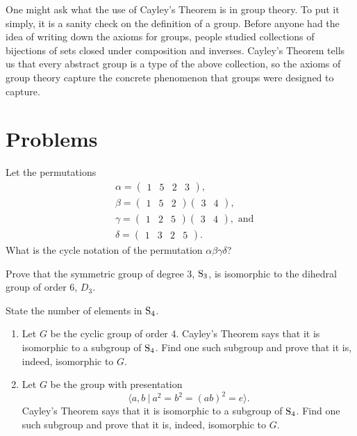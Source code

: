One might ask what the use of Cayley's Theorem is in group theory. To put it simply, it is a sanity check on the definition of a group. Before anyone had the idea of writing down the axioms for groups, people studied collections of bijections of sets closed under composition and inverses. Cayley's Theorem tells us that every abstract group is a type of the above collection, so the axioms of group theory capture the concrete phenomenon that groups were designed to capture.

\newpage

\section{Problems}
\begin{problem}
    Let the permutations
    \begin{align*}
        &\alpha = \begin{pmatrix}1 & 5 & 2 & 3\end{pmatrix},\\
        &\beta = \begin{pmatrix}1 & 5 & 2\end{pmatrix}\begin{pmatrix}3 & 4\end{pmatrix},\\
        &\gamma = \begin{pmatrix}1 & 2 & 5\end{pmatrix}\begin{pmatrix}3 & 4\end{pmatrix}, \text{ and}\\
        &\delta = \begin{pmatrix}1 & 3 & 2 & 5\end{pmatrix}.
    \end{align*}
    What is the cycle notation of the permutation $\alpha\beta\gamma\delta$?
\end{problem}

\begin{problem}
    Prove that the symmetric group of degree 3, $\mathrm{S}_{3}$, is isomorphic to the dihedral group of order 6, $D_3$.
\end{problem}

\begin{problem}
    State the number of elements in $\mathrm{S}_{4}$.
    \begin{enumerate}[label=(\alph*)]
        \item Let $G$ be the cyclic group of order 4. Cayley’s Theorem says that it is isomorphic to a subgroup of $\mathrm{S}_{4}$. Find one such subgroup and prove that it is, indeed, isomorphic to $G$.
        \item Let $G$ be the group with presentation
        \[
            \langle a, b \ | \ a^2 = b^2 = (ab)^2 = e \rangle.
        \]
        Cayley’s Theorem says that it is isomorphic to a subgroup of $\mathrm{S}_{4}$. Find one such subgroup and prove that it is, indeed, isomorphic to $G$.
    \end{enumerate}
\end{problem}

